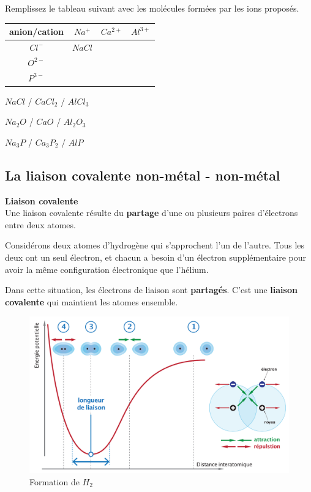 \documentclass[
  11pt,
  a4paper,
  openany]{book}
\begin{document}
\begin{Exercise}
Remplissez le tableau suivant avec les molécules formées par les ions proposés.

\end{Exercise}

\begin{longtable}[]{@{}cccc@{}}
\toprule\noalign{}
anion/cation & \(Na^+\) & \(Ca^{2+}\) & \(Al^{3+}\) \\
\midrule\noalign{}
\endhead
\bottomrule\noalign{}
\endlastfoot
\(Cl^{-}\) & \(NaCl\) & & \\
\(O^{2-}\) & & & \\
\(P^{3-}\) & & & \\
\end{longtable}

\begin{Answer}
\(NaCl\) / \(CaCl_2\) / \(AlCl_3\)

\(Na_2O\) / \(CaO\) / \(Al_2O_3\)

\(Na_3P\) / \(Ca_3P_2\) / \(AlP\)

\end{Answer}

\newpage

\subsection{La liaison covalente \textbar{} non-métal - non-métal}\label{la-liaison-covalente-non-muxe9tal---non-muxe9tal}

\begin{tcolorbox}
\textbf{Liaison covalente}\\
Une liaison covalente résulte du \textbf{partage} d'une ou plusieurs paires d'électrons entre deux atomes.

\end{tcolorbox}

Considérons deux atomes d'hydrogène qui s'approchent l'un de l'autre. Tous les deux ont un seul électron, et chacun a besoin d'un électron supplémentaire pour avoir la même configuration électronique que l'hélium.

Dans cette situation, les électrons de liaison sont \textbf{partagés}. C'est une \textbf{liaison covalente} qui maintient les atomes ensemble.

\begin{figure}

{\centering \includegraphics[width=0.5\linewidth]{images/H2-bond} 

}

\caption{Formation de $H_2$}\label{fig:H2-bond}
\end{figure}
\end{document}
